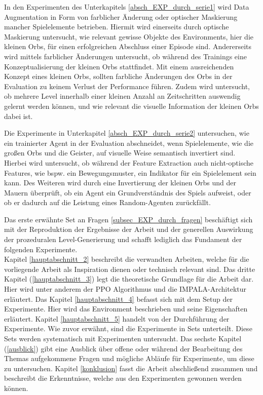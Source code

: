 In den Experimenten des Unterkapitels \ref{absch_EXP_durch_serie1} wird Data Augmentation in Form von farblicher Änderung oder optischer Maskierung mancher Spielelemente betrieben. Hiermit wird einerseits durch optische Maskierung untersucht, wie relevant gewisse Objekte des Environments, hier die kleinen Orbs, für einen erfolgreichen Abschluss einer Episode sind. Andererseits wird mittels farblicher Änderungen untersucht, ob während des Trainings eine Konzeptualisierung der kleinen Orbs stattfindet. Mit einem ausreichenden Konzept eines kleinen Orbs, sollten farbliche Änderungen des Orbs in der Evaluation zu keinem Verlust der Performance führen. Zudem wird untersucht, ob mehrere Level innerhalb einer kleinen Anzahl an Zeitschritten auswendig gelernt werden können, und wie relevant die visuelle Information der kleinen Orbs dabei ist.

Die Experimente in Unterkapitel \ref{absch_EXP_durch_serie2} untersuchen, wie ein trainierter Agent in der Evaluation abschneidet, wenn Spielelemente, wie die großen Orbs und die Geister, auf visuelle Weise semantisch invertiert sind. Hierbei wird untersucht, ob während der Feature Extraction auch nicht-optische Features, wie bspw. ein Bewegungsmuster, ein Indikator für ein Spielelement sein kann. Des Weiteren wird durch eine Invertierung der kleinen Orbs und der Mauern überprüft, ob ein Agent ein Grundverständnis des Spiels aufweist, oder ob er dadurch auf die Leistung eines Random-Agenten zurückfällt. 

Das erste erwähnte Set an Fragen \ref{subsec_EXP_durch_fragen} beschäftigt sich mit der Reproduktion der Ergebnisse der Arbeit \cite{cobbe2019procgen} und der generellen Auswirkung der prozeduralen Level-Generierung und schafft lediglich das Fundament der folgenden Experimente.\\



Kapitel \ref{hauptabschnitt_2} beschreibt die verwandten Arbeiten, welche für die vorliegende Arbeit als Inspiration dienen oder technisch relevant sind. Das dritte Kapitel (\ref{hauptabschnitt_3}) legt die theoretische Grundlage für die Arbeit dar. Hier wird unter anderem der PPO Algorithmus und die IMPALA-Architektur erläutert. Das Kapitel \ref{hauptabschnitt_4} befasst sich mit dem Setup der Experimente. Hier wird das Environment beschrieben und seine Eigenschaften erläutert. Kapitel \ref{hauptabschnitt_5} handelt von der Durchführung der Experimente. Wie zuvor erwähnt, sind die Experimente in Sets unterteilt. Diese Sets werden systematisch mit Experimenten untersucht. Das sechste Kapitel (\ref{ausblick}) gibt eine Ausblick über offene oder während der Bearbeitung des Themas aufgekommene Fragen und mögliche Abläufe für Experimente, um diese zu untersuchen. Kapitel \ref{konklusion} fasst die Arbeit abschließend zusammen und beschreibt die Erkenntnisse, welche aus den Experimenten gewonnen werden können. 


\newpage